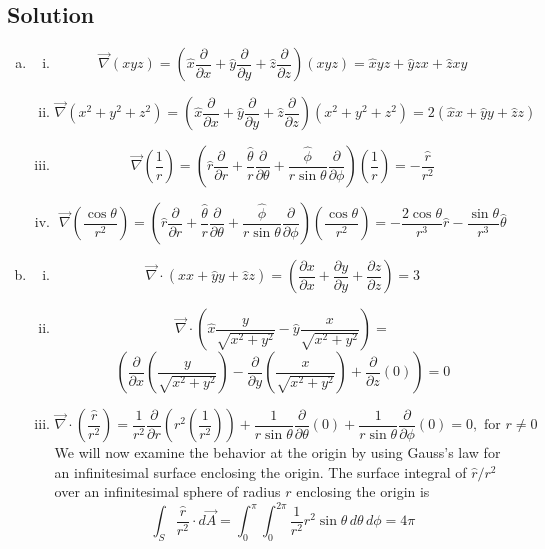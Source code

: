 \documentclass[solutions]{esg8022pset}
\newcommand{\Kgrad}{\left(\hat{x} \frac{\partial}{\partial x} + \hat{y} \frac{\partial}{\partial y} + \hat{z} \frac{\partial}{\partial z}\right)}
\newcommand{\Kdiv}[6]{{#4}\left(\frac{\partial {#1}}{\partial x} {#5} \frac{\partial {#2}}{\partial y} {#6}\frac{\partial #3}{\partial z} \right)}
\newcommand{\KKdiv}[6]{{#4}\left(\frac{\partial}{\partial x}{#1} {#5} \frac{\partial}{\partial y}{#2} {#6}\frac{\partial}{\partial z}{#3} \right)}
\newcommand{\dtheta}{\frac{\partial}{\partial \theta}}
\newcommand{\dr}{\frac{\partial}{\partial r}}
\begin{document}
\subsection{Solution}
  \begin{enumerate}[(a)]
    \item
      \begin{enumerate}[(i)]
        \item $${\vec{\nabla} (xyz)} = \Kgrad \left( xyz\right) = \hat x yz + \hat y zx + \hat z xy $$
        \item $${\vec{\nabla} \left( x^2 + y^2 + z^2 \right)} = \Kgrad \left( x^2 + y^2 + z^2\right) = 2\left( \hat x x + \hat y y + \hat z z \right) $$
        \item $${\vec{\nabla}}\left( \frac{1}{r} \right) =  \left( \hat r \dr + \frac{\hat\theta}{r} \dtheta + \frac{\hat\phi}{r \sin \theta} \frac{\partial}{\partial \phi} \right)\left( \frac{1}{r} \right) = -\frac{\hat r}{r^2} $$
        \item $${\vec{\nabla}}\left( \frac{\cos \theta}{r^2} \right) =  \left( \hat r \dr + \frac{\hat\theta}{r} \dtheta + \frac{\hat\phi}{r \sin \theta} \frac{\partial}{\partial \phi} \right)\left( \frac{\cos \theta}{r^2} \right) = -\frac{2 \cos \theta}{r^3}\hat r -\frac{ \sin \theta}{r^3}\hat\theta $$
      \end{enumerate}
    \item
      \begin{enumerate}[(i)]
        \item $${\vec{\nabla}\cdot \left( \hat{x} x + \hat{y} y + \hat{z} z \right)} = \Kdiv{x}{y}{z}{}{+}{+} = 3 $$
        \item $$\vec{\nabla}\cdot \left(\hat{x} \frac{y}{\sqrt{x^2+y^2}} - \hat{y} \frac{x}{\sqrt{x^2+y^2}}\right) = $$ $$\KKdiv{\left(\frac{y}{\sqrt{x^2+y^2}}\right)}{\left(\frac{x}{\sqrt{x^2+y^2}}\right)}{(0)}{}{-}{+} = 0$$
        \item $$\vec{\nabla}\cdot {\left(  \frac{\hat r}{r^2}  \right)} = \frac{1}{r^2} \dr\left( r^2 \left( \frac{1}{r^2} \right) \right) + \frac{1}{r \sin \theta} \dtheta\left( 0 \right) + \frac{1}{r \sin \theta} \frac{\partial}{\partial \phi}\left( 0 \right) = 0, \text{ for }r \neq  0 $$
          We will now examine the behavior at the origin by using Gauss's law for an infinitesimal surface enclosing the origin. The surface integral of $\hat r/r^2$ over an infinitesimal sphere of radius $r$ enclosing the origin is
          $$ \int_{S} \frac{\hat r}{r^2} \cdot d\vec{A} = \int_{0}^{\pi} \int_{0}^{2 \pi} \frac{1}{r^2} r^2\sin \theta\,d\theta\,d\phi = 4 \pi $$

\end{enumerate}
\end{enumerate}
\end{document}
